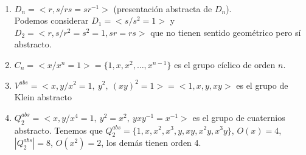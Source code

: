 \begin{ejemplo}\
    \begin{enumerate}
        \item $D_n=<r,s /rs=sr^{-1}>$ (presentación abstracta de $D_n$).\\ 
        Podemos considerar $D_1=<s/s^2=1>$ y $D_2=<r,s / r^2=s^2=1, sr=rs>$ que no tienen sentido geométrico pero sí abstracto.

        \item $C_n=<x / x^n=1>=\{1,x,x^2,\dots,x^{n-1}\}$ es el grupo cíclico de orden $n$.
        \item $V^{abs} = <x,y / x^2=1,\ y^2,\ (xy)^2=1>=<1,x,y,xy>$ es el grupo de Klein abstracto
        \item $Q_2^{abs} = <x,y/x^4=1,\ y^2=x^2,\ yxy^{-1}=x^{-1}>$ es el grupo de cuaternios abstracto. %
        Tenemos que $Q_2^{abs}=\{1,x,x^2,x^3,y,xy,x^2y,x^3y\}$, $O(x)=4$, $|Q_2^{abs}|=8$, $O(x^2)=2$, los demás tienen orden 4.\\


\end{enumerate}
\end{ejemplo}

